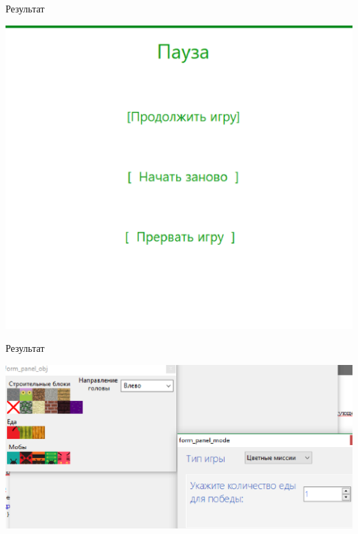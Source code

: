 \documentclass[size=14pt,paper=screen,style=paintings]{powerdot}
\begin{document}
\begin{slide}{{\normalsize Результат}}
\vspace*{1cm}
\begin{center}
\includegraphics[scale=0.5]{img10.eps}
\end{center}
\end{slide}

\begin{slide}{{\normalsize Результат}}
\vspace*{1cm}
\begin{center}
\includegraphics[scale=0.5]{img15.eps}
\end{center}

\end{slide}
\end{document}
